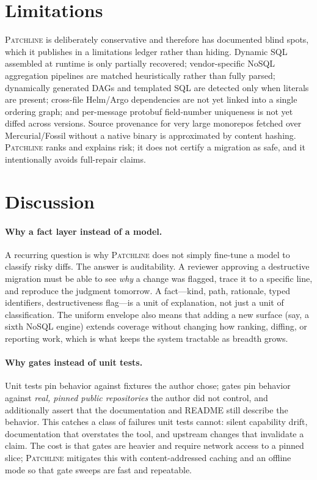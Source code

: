 \documentclass[11pt]{article}
\newcommand{\tool}{\textsc{Patchline}}
\begin{document}
\section{Limitations}
\label{sec:limits}

\tool{} is deliberately conservative and therefore has documented blind spots, which it publishes in a
limitations ledger rather than hiding. Dynamic SQL assembled at runtime is only partially recovered;
vendor-specific NoSQL aggregation pipelines are matched heuristically rather than fully parsed;
dynamically generated DAGs and templated SQL are detected only when literals are present; cross-file
Helm/Argo dependencies are not yet linked into a single ordering graph; and per-message protobuf
field-number uniqueness is not yet diffed across versions. Source provenance for very large monorepos
fetched over Mercurial/Fossil without a native binary is approximated by content hashing. \tool{}
ranks and explains risk; it does not certify a migration as safe, and it intentionally avoids
full-repair claims.

\section{Discussion}

\paragraph{Why a fact layer instead of a model.} A recurring question is why \tool{} does not simply
fine-tune a model to classify risky diffs. The answer is auditability. A reviewer approving a
destructive migration must be able to see \emph{why} a change was flagged, trace it to a specific line,
and reproduce the judgment tomorrow. A fact---kind, path, rationale, typed identifiers, destructiveness
flag---is a unit of explanation, not just a unit of classification. The uniform envelope also means
that adding a new surface (say, a sixth NoSQL engine) extends coverage without changing how ranking,
diffing, or reporting work, which is what keeps the system tractable as breadth grows.

\paragraph{Why gates instead of unit tests.} Unit tests pin behavior against fixtures the author
chose; gates pin behavior against \emph{real, pinned public repositories} the author did not control,
and additionally assert that the documentation and README still describe the behavior. This catches a
class of failures unit tests cannot: silent capability drift, documentation that overstates the tool,
and upstream changes that invalidate a claim. The cost is that gates are heavier and require network
access to a pinned slice; \tool{} mitigates this with content-addressed caching and an offline mode so
that gate sweeps are fast and repeatable.
\end{document}
